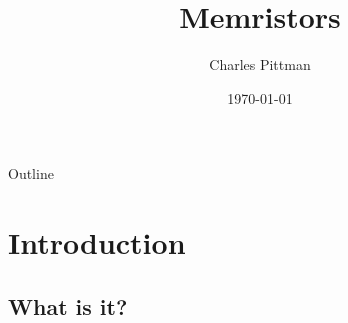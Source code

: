 \documentclass{beamer}
\title{Memristors}
\author{Charles Pittman}
\institute{The Citadel\\ELEC-424}
\date{\today}
\begin{document}
\begin{frame}
  \titlepage
\end{frame}

\begin{frame}{Outline}
  \tableofcontents
\end{frame}




\section{Introduction}

\subsection{What is it?}



\end{document}
